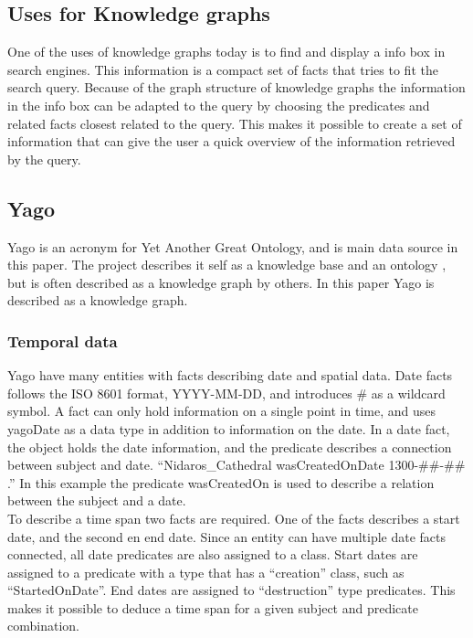 \subsection{Uses for Knowledge graphs}
One of the uses of knowledge graphs today is to find and display a info box in search engines. This information is a compact set of facts that tries to fit the search query. Because of the graph structure of knowledge graphs the information in the info box can be adapted to the query by choosing the predicates and related facts closest related to the query. This makes it possible to create a set of information that can give the user a quick overview of the information retrieved by the query.\\

\subsection{Yago}
Yago is an acronym for Yet Another Great Ontology, and is main data source in this paper. The project describes it self as a knowledge base\cite{yago} and an ontology \cite{mahdisoltani:hal-01699874}, but is often described as a knowledge graph by others. In this paper Yago is described as a knowledge graph.\\

\subsubsection{Temporal data}
Yago have many entities with facts describing date and spatial data.\cite{yago} Date facts follows the ISO 8601 format, YYYY-MM-DD, and introduces \# as a wildcard symbol. A fact can only hold information on a single point in time, and uses yagoDate as a data type in addition to information on the date.\cite{yago} In a date fact, the object holds the date information, and the predicate describes a connection between subject and date. ``Nidaros\_Cathedral wasCreatedOnDate 1300-\#\#-\#\# .'' In this example the predicate wasCreatedOn is used to describe a relation between the subject and a date.\\

To describe a time span two facts are required. One of the facts describes a start date, and the second en end date. Since an entity can have multiple date facts connected, all date predicates are also assigned to a class. Start dates are assigned to a predicate with a type that has a ``creation'' class, such as ``StartedOnDate''. End dates are assigned to ``destruction'' type predicates. This makes it possible to deduce a time span for a given subject and predicate combination.\cite{yago}\\

